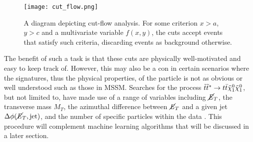 \begin{figure}[htbp]
    \centering
    \texttt{[image: cut\_flow.png]}
    \caption{A diagram depicting cut-flow analysis. For some criterion $x>a$, $y>c$ and a multivariate variable $f(x,y)$, the cuts accept events that satisfy such criteria, discarding events as background otherwise.}
    \label{fig:cut_flow}
\end{figure}

The benefit of such a task is that these cuts are physically well-motivated and easy to keep track of. However, this may also be a con in certain scenarios where the signatures, thus the physical properties, of the particle is not as obvious or well understood such as those in MSSM. Searches for the process $\Tilde{t}\Tilde{t}^*  \rightarrow t\bar{t}\Tilde{\chi}_1^0\Tilde{\chi}_1^0$, but not limited to, have made use of a range of variables including $\cancel{\it{E}}_{T}$, the transverse mass $M_T$, the azimuthal difference between $\cancel{\it{E}}_{T}$ and a given jet $\Delta \phi (\cancel{\it{E}}_{T}, \text{jet})$, and the number of specific particles within the data \cite{kraml2016scalar, chatrchyan2013search}. This procedure will complement machine learning algorithms that will be discussed in a later section.